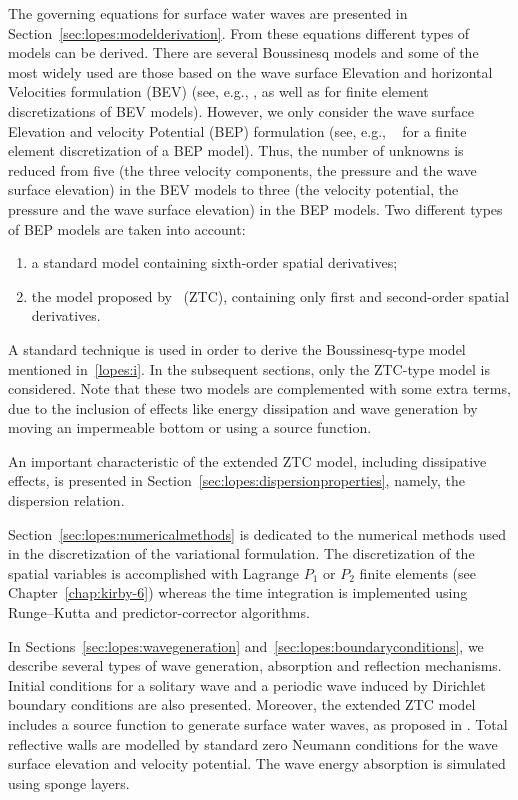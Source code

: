 The governing equations for surface water waves are presented
in Section~\ref{sec:lopes:modelderivation}. From these equations
different types of models can be derived. There are several Boussinesq
models and some of the most widely used are those based on the wave
surface Elevation and horizontal Velocities formulation (BEV) (see,
e.g., \citet{WalkleyBerzins2002}, \citet{WooLiu2004a} as well as
\citet{WooLiu2004b} for finite element discretizations of BEV models).
However, we only consider the wave surface Elevation and velocity
Potential (BEP) formulation (see, e.g., ~\citet{LangtangenPedersen1998}
for a finite element discretization of a BEP model).  Thus, the number
of unknowns is reduced from five (the three velocity components, the
pressure and the wave surface elevation) in the BEV models to three (the
velocity potential, the pressure and the wave surface elevation) in the
BEP models. Two different types of BEP models are taken into account:
\begin{enumerate}
\item \label{lopes:i}  a standard  model containing sixth-order
  spatial derivatives;
\item the  model proposed by~\citet{ZhaoTengCheng2004} (ZTC),
 containing only first and second-order spatial derivatives.
\end{enumerate}

A standard technique is used in order to derive the Boussinesq-type
model mentioned in~\ref{lopes:i}.  In the subsequent sections, only the
ZTC-type model is considered.  Note that these two models are
complemented with some extra terms, due to the inclusion of effects
like energy dissipation and wave generation by moving an impermeable
bottom or using a source function.

An important characteristic of the extended ZTC
model, including dissipative effects, is presented in
Section~\ref{sec:lopes:dispersionproperties}, namely, the dispersion
relation.

Section~\ref{sec:lopes:numericalmethods} is dedicated to the numerical
methods used in the discretization of the variational formulation.
The discretization of the spatial variables is accomplished with
Lagrange $P_1$ or $P_2$ finite elements (see
Chapter~\ref{chap:kirby-6}) whereas the time integration is
implemented using Runge--Kutta and predictor-corrector algorithms.

In Sections~\ref{sec:lopes:wavegeneration}
and~\ref{sec:lopes:boundaryconditions}, we describe several types of
wave generation, absorption and reflection mechanisms. Initial
conditions for a solitary wave and a periodic wave induced by
Dirichlet boundary conditions are also presented. Moreover, the
extended ZTC model includes a source function to generate surface
water waves, as proposed in \citet{WeiKirbySinha1999}. Total
reflective walls are modelled by standard zero Neumann conditions for
the wave surface elevation and velocity potential.  The wave energy
absorption is simulated using sponge layers.

